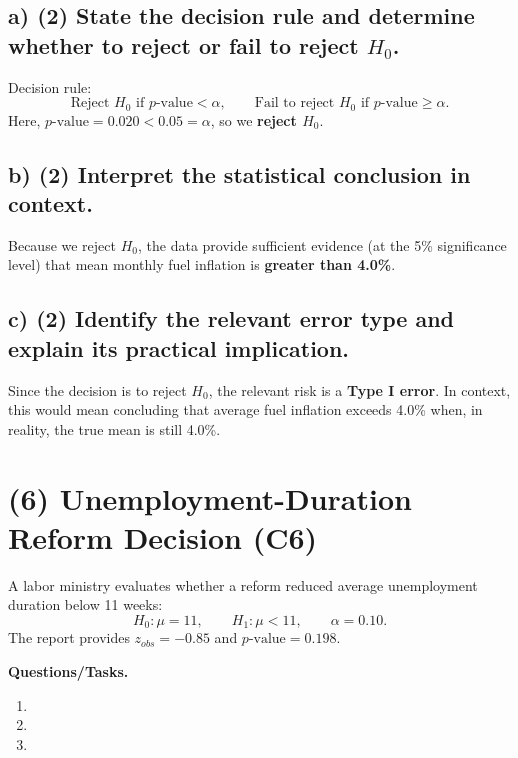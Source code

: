 \subsection*{a) \textbf{(2)} State the decision rule and determine whether to reject or fail to reject \(H_0\).}
\label{subsec:fuel-inflation-claim-decision-c6-a}
Decision rule:
\[
\text{Reject }H_0\text{ if }p\text{-value}<\alpha,
\qquad
\text{Fail to reject }H_0\text{ if }p\text{-value}\ge \alpha.
\]
Here, \(p\text{-value}=0.020<0.05=\alpha\), so we \textbf{reject \(H_0\)}.


\subsection*{b) \textbf{(2)} Interpret the statistical conclusion in context.}
\label{subsec:fuel-inflation-claim-decision-c6-b}
Because we reject \(H_0\), the data provide sufficient evidence (at the 5\% significance level) that mean monthly fuel inflation is \textbf{greater than 4.0\%}.


\subsection*{c) \textbf{(2)} Identify the relevant error type and explain its practical implication.}
\label{subsec:fuel-inflation-claim-decision-c6-c}
Since the decision is to reject \(H_0\), the relevant risk is a \textbf{Type I error}. In context, this would mean concluding that average fuel inflation exceeds 4.0\% when, in reality, the true mean is still 4.0\%.


\section{(6) Unemployment-Duration Reform Decision (C6)}
\label{sec:unemployment-duration-claim-decision-c6}
A labor ministry evaluates whether a reform reduced average unemployment duration below 11 weeks:
\[
H_0:\mu=11,\qquad H_1:\mu<11,\qquad \alpha=0.10.
\]
The report provides \(z_{obs}=-0.85\) and \(p\text{-value}=0.198\).

\textbf{Questions/Tasks.}
\begin{enumerate}[label=\textbf{\alph*)}]
    \item {}
    \item {}
    \item {}
\end{enumerate}

